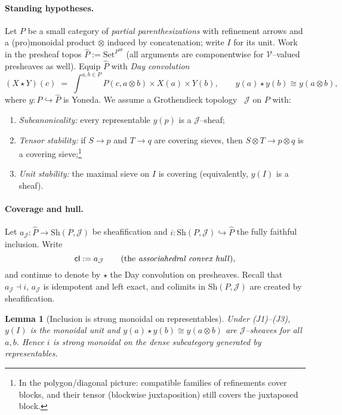 \documentclass[11pt]{article}
\numberwithin{equation}{section}
\theoremstyle{upright}
\newtheorem{lemma}{Lemma}
\newcommand{\V}{\mathcal{V}}
\newcommand{\Sh}{\mathrm{Sh}}
\begin{document}
\paragraph{Standing hypotheses.}
Let $P$ be a small category of \emph{partial parenthesizations} with refinement arrows
and a (pro)monoidal product $\otimes$ induced by concatenation; write $I$ for its unit.
Work in the presheaf topos $\widehat P:=\mathrm{Set}^{P^{op}}$ (all arguments
are componentwise for $\V$--valued presheaves as well).
Equip $\widehat P$ with \emph{Day convolution}
\[
(X\star Y)(c)\;=\;\int^{a,b\in P} P(c,a\otimes b)\times X(a)\times Y(b),
\qquad
y(a)\star y(b)\cong y(a\otimes b),
\]
where $y:P\hookrightarrow \widehat P$ is Yoneda. We assume a Grothendieck topology~\citealp{MacLaneMoerdijk1992}
$\mathcal J$ on $P$ with:
\begin{enumerate}[label=(J\arabic*), itemsep=0.25ex]
\item \emph{Subcanonicality:} every representable $y(p)$ is a $\mathcal J$--sheaf;
\item \emph{Tensor stability:} if $S\to p$ and $T\to q$ are covering sieves, then
$S\otimes T\to p\otimes q$ is a covering sieve;\footnote{In the polygon/diagonal picture:
compatible families of refinements cover blocks, and their tensor (blockwise juxtaposition)
still covers the juxtaposed block.}
\item \emph{Unit stability:} the maximal sieve on $I$ is covering (equivalently, $y(I)$ is a sheaf).
\end{enumerate}

\paragraph{Coverage and hull.}
Let $a_{\mathcal J}:\widehat P\to \Sh(P,\mathcal J)$ be sheafification and
$i:\Sh(P,\mathcal J)\hookrightarrow \widehat P$ the fully faithful inclusion.
Write
\[
\mathsf{cl}:=a_{\mathcal J} \qquad(\text{the \emph{associahedral convex hull}}),
\]
and continue to denote by $\star$ the Day convolution on presheaves. Recall that
$a_{\mathcal J}\dashv i$, $a_{\mathcal J}$ is idempotent and left exact, and
colimits in $\Sh(P,\mathcal J)$ are created by sheafification.

\begin{lemma}[Inclusion is strong monoidal on representables]\label{lem:rep-strong}
Under \emph{(J1)--(J3)}, $y(I)$ is the monoidal unit and
$y(a)\star y(b)\cong y(a\otimes b)$ are $\mathcal J$--sheaves for all $a,b$.
Hence $i$ is \emph{strong monoidal} on the dense subcategory generated by representables.
\end{lemma}
\end{document}
